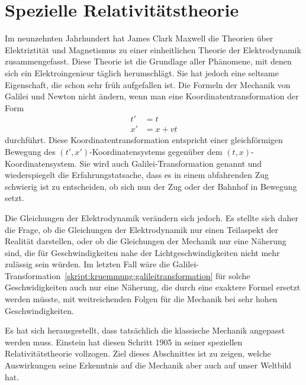 %
%
%

\section{Spezielle Relativitätstheorie}
Im neunzehnten Jahrhundert hat James Clark Maxwell die Theorien
über Elektriztität und Magnetismus zu einer einheitlichen Theorie
der Elektrodynamik zusammengefasst.
Diese Theorie ist die Grundlage aller Phänomene, mit denen sich
ein Elektroingenieur täglich herumschlägt.
Sie hat jedoch eine seltsame Eigenschaft, die schon sehr früh
aufgefallen ist.
Die Formeln der Mechanik von Galilei und Newton nicht ändern,
wenn man eine Koordinatentransformation der Form
\begin{equation}
\begin{aligned}
t'&=t\\
x'&=x+vt
\end{aligned}
\label{skript:kruemmung:galileitransformation}
\end{equation}
durchführt.
Diese Koordinatentransformation entspricht einer gleichförmigen
Bewegung des $(t',x')$-Koordinatensystems gegenüber dem 
$(t,x)$-Koordinatensystem.
Sie wird auch Galilei-Transformation genannt und wiederspiegelt die
Erfahrungstatsache, dass es in einem abfahrenden Zug schwierig ist
zu entscheiden, ob sich nun der Zug oder der Bahnhof in Bewegung setzt.

Die Gleichungen der Elektrodynamik verändern sich jedoch.
Es stellte sich daher die Frage, ob die Gleichungen der Elektrodynamik
nur einen Teilaspekt der Realität darstellen, oder ob die Gleichungen
der Mechanik nur eine Näherung sind, die für Geschwindigkeiten nahe
der Lichtgeschwindigkeiten nicht mehr zulässig sein würden.
Im letzten Fall wäre die
Galilei-Transformation~\eqref{skript:kruemmung:galileitransformation}
für solche Geschwidigkeiten auch nur eine Näherung, die durch
eine exaktere Formel ersetzt werden müsste, mit weitreichenden
Folgen für die Mechanik bei sehr hohen Geschwindigkeiten.

Es hat sich herausgestellt, dass tatsächlich die klassische Mechanik
angepasst werden muss.
Einstein hat diesen Schritt 1905 in seiner speziellen Relativitätstheorie
vollzogen.
Ziel dieses Abschnittes ist zu zeigen, welche Auswirkungen seine
Erkenntnis auf die Mechanik aber auch auf unser Weltbild hat.

